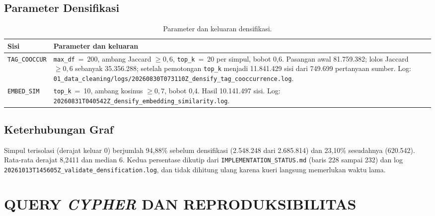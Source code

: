 \section{Parameter Densifikasi}
\label{sec:lamp-kg-densifikasi}

\begin{table}[!htbp]
\centering
\small
\caption{Parameter dan keluaran densifikasi.}
\label{tab:lamp-densifikasi}
\renewcommand{\arraystretch}{1.2}
\begin{tabularx}{\textwidth}{|>{\raggedright\arraybackslash}p{2.6cm}|>{\raggedright\arraybackslash}X|}
\hline
\textbf{Sisi} & \textbf{Parameter dan keluaran} \\
\hline
\texttt{TAG\_COOCCUR} & \texttt{max\_df}~=~200, ambang Jaccard $\geq 0{,}6$, \texttt{top\_k}~=~20 per simpul, bobot 0,6. Pasangan awal 81.759.382; lolos Jaccard $\geq 0{,}6$ sebanyak 35.356.288; setelah pemotongan \texttt{top\_k} menjadi 11.841.429 sisi dari 749.699 pertanyaan sumber. Log: \texttt{01\_\allowbreak{}data\_\allowbreak{}cleaning/\allowbreak{}logs/\allowbreak{}20260830T073110Z\_\allowbreak{}densify\_\allowbreak{}tag\_\allowbreak{}cooccurrence.\allowbreak{}log}. \\
\hline
\texttt{EMBED\_SIM} & \texttt{top\_k}~=~10, ambang kosinus $\geq 0{,}7$, bobot 0,4. Hasil 10.141.497 sisi. Log: \texttt{20260831T040542Z\_\allowbreak{}densify\_\allowbreak{}embedding\_\allowbreak{}similarity.\allowbreak{}log}. \\
\hline
\end{tabularx}
\end{table}

\section{Keterhubungan Graf}
\label{sec:lamp-kg-isolasi}

Simpul terisolasi (derajat keluar 0) berjumlah 94,88\% sebelum densifikasi (2.548.248 dari 2.685.814) dan 23,10\% sesudahnya (620.542). Rata-rata derajat 8,2411 dan median 6. Kedua persentase dikutip dari \texttt{IMPLEMENTATION\_\allowbreak{}STATUS.\allowbreak{}md} (baris 228 sampai 232) dan log \texttt{20261013T145605Z\_\allowbreak{}validate\_\allowbreak{}densification.\allowbreak{}log}, dan tidak dihitung ulang karena kueri langsung memerlukan waktu lama.

\cleardoublepage
\chapter{QUERY \textit{CYPHER} DAN REPRODUKSIBILITAS}
\label{lamp:repro}

